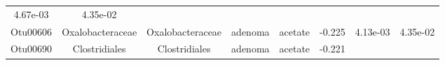 \documentclass[11pt,]{article}
\begin{document}
\begin{longtable}[]{@{}cccccccc@{}}
\begin{minipage}[t]{0.08\columnwidth}
4.67e-03\strut
\end{minipage} & \begin{minipage}[t]{0.08\columnwidth}\centering\strut
4.35e-02\strut
\end{minipage}\tabularnewline
\begin{minipage}[t]{0.08\columnwidth}\centering\strut
Otu00606\strut
\end{minipage} & \begin{minipage}[t]{0.15\columnwidth}\centering\strut
Oxalobacteraceae\strut
\end{minipage} & \begin{minipage}[t]{0.15\columnwidth}\centering\strut
Oxalobacteraceae\strut
\end{minipage} & \begin{minipage}[t]{0.08\columnwidth}\centering\strut
adenoma\strut
\end{minipage} & \begin{minipage}[t]{0.09\columnwidth}\centering\strut
acetate\strut
\end{minipage} & \begin{minipage}[t]{0.07\columnwidth}\centering\strut
-0.225\strut
\end{minipage} & \begin{minipage}[t]{0.08\columnwidth}\centering\strut
4.13e-03\strut
\end{minipage} & \begin{minipage}[t]{0.08\columnwidth}\centering\strut
4.35e-02\strut
\end{minipage}\tabularnewline
\begin{minipage}[t]{0.08\columnwidth}\centering\strut
Otu00690\strut
\end{minipage} & \begin{minipage}[t]{0.15\columnwidth}\centering\strut
Clostridiales\strut
\end{minipage} & \begin{minipage}[t]{0.15\columnwidth}\centering\strut
Clostridiales\strut
\end{minipage} & \begin{minipage}[t]{0.08\columnwidth}\centering\strut
adenoma\strut
\end{minipage} & \begin{minipage}[t]{0.09\columnwidth}\centering\strut
acetate\strut
\end{minipage} & \begin{minipage}[t]{0.07\columnwidth}\centering\strut
-0.221\strut
\end{minipage} & \begin{minipage}[t]{0.08\columnwidth}\centering\strut

\end{minipage}
\end{longtable}
\end{document}
